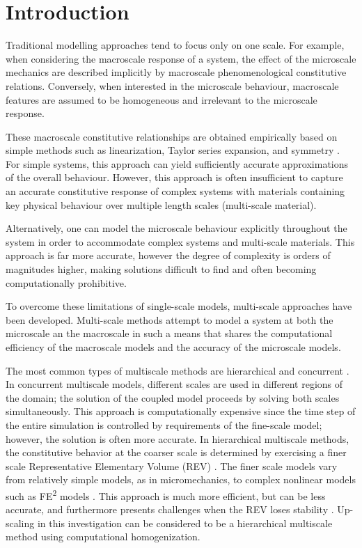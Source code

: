 \chapter{Introduction}
Traditional modelling approaches tend to focus only on one scale. For example, when considering the macroscale response of a system, the effect of the microscale mechanics are described implicitly by macroscale phenomenological constitutive relations. Conversely, when interested in the microscale behaviour, macroscale features are assumed to be homogeneous and irrelevant to the microscale response. 

These macroscale constitutive relationships are obtained empirically based on simple methods such as linearization, Taylor series expansion, and symmetry \cite{weinan_principles_2011}. For simple systems, this approach can yield sufficiently accurate approximations of the overall behaviour. However, this approach is often insufficient to capture an accurate constitutive response of complex systems with materials containing key physical behaviour over multiple length scales (multi-scale material). 

Alternatively, one can model the microscale behaviour explicitly throughout the system in order to accommodate complex systems and multi-scale materials. This approach is far more accurate, however the degree of complexity is orders of magnitudes higher, making solutions difficult to find and often becoming computationally prohibitive. 

To overcome these limitations of single-scale models, multi-scale approaches have been developed. Multi-scale methods attempt to model a system at both the microscale an the macroscale in such a means that shares the computational efficiency of the macroscale models and the accuracy of the microscale models.

The most common types of multiscale methods are hierarchical and concurrent \citep{Gracie_2011}. In concurrent multiscale models, different scales are used in different regions of the domain; the solution of the coupled model proceeds by solving both scales simultaneously. This approach is computationally expensive since the time step of the entire simulation is controlled by requirements of the fine-scale model; however, the solution is often more accurate.  In hierarchical multiscale methods, the constitutive behavior at the coarser scale is determined by exercising a finer scale Representative Elementary Volume (REV) \citep{Li_2014}. The finer scale models vary from relatively simple models, as in micromechanics, to complex nonlinear models such as FE\textsuperscript{2} models \citep{Feyel_2003}. This approach is much more efficient, but can be less accurate, and furthermore  presents challenges when the REV loses stability \citep{Belytschko_2008}. Up-scaling in this investigation can be considered to be a hierarchical multiscale method using computational homogenization. 

